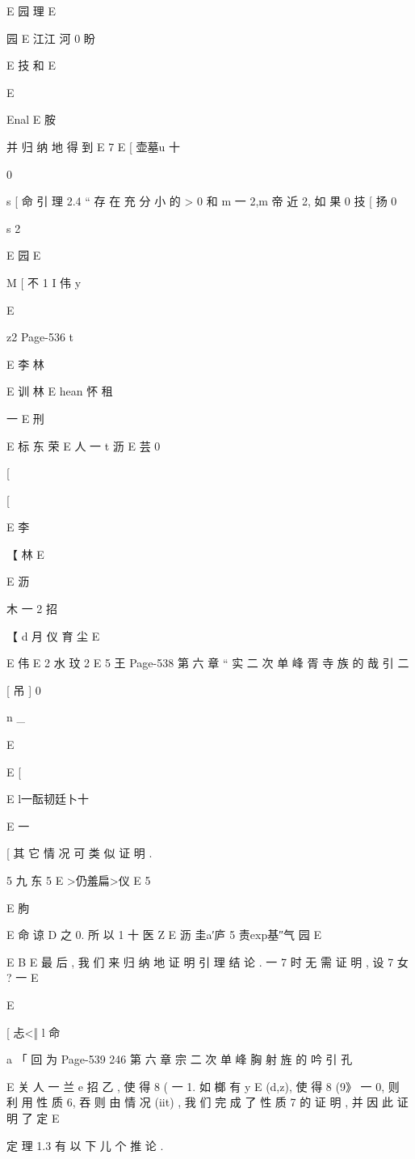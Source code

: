 {{E 园 理
E

园
E 江江 河 0 盼

E 技
和
E

E

Enal
E 胺

并 归 纳 地 得 到
E
7 E
[ 壶墓u 十

0

s
[ 命
引 理 2.4 “ 存 在 充 分 小 的 > 0 和 m 一 2,m 帝 近 2, 如 果
0 技
[ 扬
0

s
2

E 园
E

M
[ 不 1
I 伟 y

E

z2
Page-536
t

E 李 林

E
训 林
E hean 怀 租

一
E 刑

E 标 东 荣
E 人 一
t 沥
E 芸
0

[

[

E 李

【
林
E

E
沥

木 一
2
招

【 d 月 仪 育 尘 E

E 伟
E
2
水
玟 2
E 5 王
Page-538
第 六 章 “ 实 二 次 单 峰 胥 寺 族 的 哉 引 二

[ 吊 ]
0

n _

E

E [

E
l一酝韧廷卜十

E 一

[
其 它 情 况 可 类 似 证 明 .

5 九 东 5
E >仍羞扁>仪 E
5

E 朐

E 命 谅
D 之 0. 所 以 1 十
医
Z
E 沥 圭a′庐 5 责exp基″气 园
E

E B
E
最 后 , 我 们 来 归 纳 地 证 明 引 理 结 论 . 一 7 时 无 需 证 明 , 设 7 女 ? 一
E

E

[
忐<‖ l 命

a 「
回 为
Page-539
246 第 六 章 宗 二 次 单 峰 胸 射 旌 的 吟 引 孔

E 关 人 一 兰 e 招
乙 , 使 得 8 ( 一 1. 如 榔 有 y E (d,z), 使 得 8 (9》 一 0, 则 利 用 性
质 6, 吞 则 由 情 况 (iit) , 我 们 完 成 了 性 质 7 的 证 明 , 并 因 此 证 明 了 定
E

定 理 1.3 有 以 下 儿 个 推 论 .

}}
